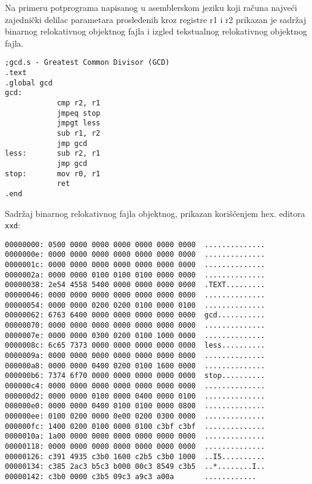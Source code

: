 \noindent
Na primeru potprograma napisanog u asemblerskom jeziku koji računa najve\-ći zajednički delilac
parametara prosleđenih kroz registre r1 i r2 prikazan je sadržaj binarnog relokativnog objektnog
fajla i izgled tekstualnog relokati\-vnog objektnog fajla.
\begin{lstlisting}
;gcd.s - Greatest Common Divisor (GCD)
.text
.global gcd
gcd:
            cmp r2, r1
            jmpeq stop
            jmpgt less
            sub r1, r2
            jmp gcd
less:       sub r2, r1
            jmp gcd
stop:       mov r0, r1
            ret
.end
\end{lstlisting}
Sadržaj binarnog relokativnog fajla objektnog, prikazan korišćenjem hex. editora \texttt{xxd}:
\begin{lstlisting}
00000000: 0500 0000 0000 0000 0000 0000 0000  ..............
0000000e: 0000 0000 0000 0000 0000 0000 0000  ..............
0000001c: 0000 0000 0000 0000 0000 0000 0000  ..............
0000002a: 0000 0000 0100 0100 0100 0000 0000  ..............
00000038: 2e54 4558 5400 0000 0000 0000 0000  .TEXT.........
00000046: 0000 0000 0000 0000 0000 0000 0000  ..............
00000054: 0000 0000 0200 0200 0100 0000 0100  ..............
00000062: 6763 6400 0000 0000 0000 0000 0000  gcd...........
00000070: 0000 0000 0000 0000 0000 0000 0000  ..............
0000007e: 0000 0000 0300 0200 0100 1000 0000  ..............
0000008c: 6c65 7373 0000 0000 0000 0000 0000  less..........
0000009a: 0000 0000 0000 0000 0000 0000 0000  ..............
000000a8: 0000 0000 0400 0200 0100 1600 0000  ..............
000000b6: 7374 6f70 0000 0000 0000 0000 0000  stop..........
000000c4: 0000 0000 0000 0000 0000 0000 0000  ..............
000000d2: 0000 0000 0100 0000 0400 0000 0100  ..............
000000e0: 0000 0000 0400 0100 0100 0000 0800  ..............
000000ee: 0100 0200 0000 0e00 0200 0300 0000  ..............
000000fc: 1400 0200 0100 0000 0100 c3bf c3bf  ..............
0000010a: 1a00 0000 0000 0000 0000 0000 0000  ..............
00000118: 0000 0000 0000 0000 0000 0000 0000  ..............
00000126: c391 4935 c3b0 1600 c2b5 c3b0 1000  ..I5..........
00000134: c385 2ac3 b5c3 b000 00c3 8549 c3b5  ..*........I..
00000142: c3b0 0000 c3b5 09c3 a9c3 a00a       ............
\end{lstlisting}
\newpage %

